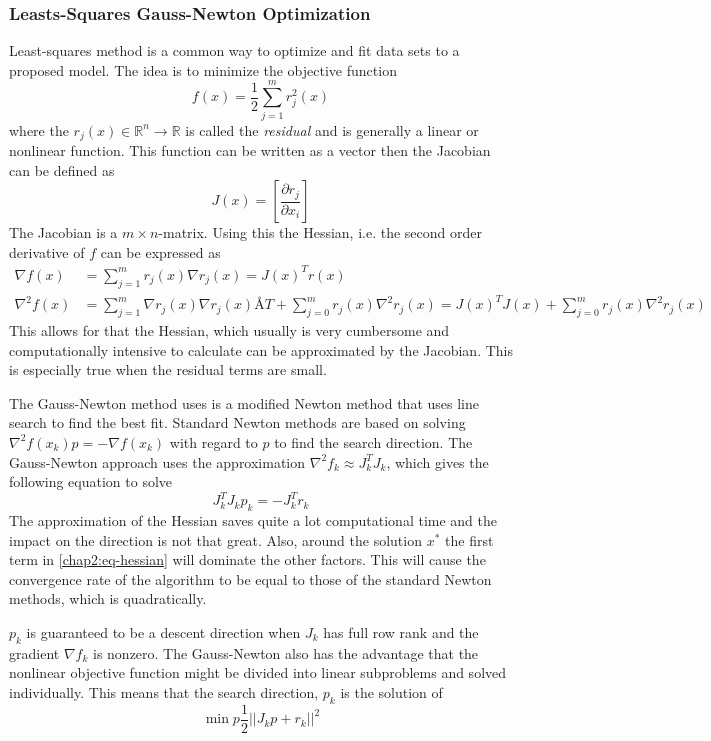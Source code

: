 \subsubsection{Leasts-Squares Gauss-Newton Optimization}
Least-squares method is a common way to optimize and fit data sets to a proposed model.
The idea is to minimize the objective function 
\begin{equation}
    f(x) = \frac{1}{2} \sum_{j = 1}^m r^2_j (x)
\end{equation}
where the $r_j(x) \in \mathbb{R}^n \rightarrow \mathbb{R}$ is called the \emph{residual} and
is generally a linear or nonlinear function. This function can be written as a vector then
the Jacobian can be defined as
\begin{equation}
    J (x) = \left[ \frac{\partial r_j}{\partial x_i} \right]
\end{equation}
The Jacobian is a $m \times n$-matrix. Using this the Hessian, i.e. the second order
derivative of $f$ can be expressed as
\begin{align}
    \nabla f(x) &= \sum_{j = 1}^m r_j(x) \nabla r_j(x) = J(x)^T r(x) \\
    \nabla^2 f(x) &= \sum_{j=1}^m \nabla r_j (x) \nabla r_j(x)Å T + \sum_{j=0}^m r_j(x)
    \nabla^2 r_j(x) = J(x)^T J(x) + \sum_{j= 0}^m r_j(x) \nabla^2 r_j(x)
    \label{chap2:eq-hessian}
\end{align}
This allows for that the Hessian, which usually is very cumbersome and computationally
intensive to calculate can be approximated by the Jacobian. This is especially true when
the residual terms are small.

The Gauss-Newton method uses is a modified Newton method that uses line search to find the
best fit. Standard Newton methods are based on solving $\nabla^2 f(x_k) p = -\nabla
f(x_k)$ with regard to $p$ to find the search direction. The Gauss-Newton approach uses
the approximation $\nabla^2 f_k \approx  J_k^T J_k$, which gives the following equation to
solve
\begin{equation}
    J_k^T J_k p_k = - J_k^T r_k
\end{equation}
The approximation of the Hessian saves quite a lot computational time and the impact on
the direction is not that great. Also, around the solution $x^*$ the first term in
\eqref{chap2:eq-hessian} will dominate the other factors. This will cause the convergence
rate of the algorithm to be equal to those of the standard Newton methods, which is
quadratically. 

$p_k$ is guaranteed to be a descent direction when $J_k$ has full row rank and the
gradient $\nabla f_k$ is nonzero. The Gauss-Newton also has the advantage that the
nonlinear objective function might be divided into linear subproblems and solved
individually. This means that the search direction, $p_k$ is the solution of
\begin{equation}
    \min{p} \frac{1}{2} || J_k p + r_k ||^2
\end{equation}

